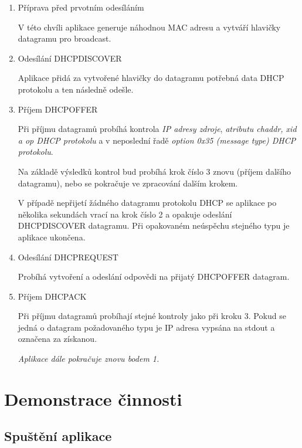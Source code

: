\documentclass[a4paper,11pt]{article}
\begin{document}
\begin{enumerate}
	\item Příprava před prvotním odesíláním
	
	V této chvíli aplikace generuje náhodnou MAC adresu a vytváří hlavičky datagramu pro broadcast.
	
	
	\item Odesílání \textsf{DHCPDISCOVER}
	
	Aplikace přidá za vytvořené hlavičky do datagramu potřebná data DHCP protokolu a ten následně odešle.
	
	
	\item Příjem \textsf{DHCPOFFER}
	
	Při příjmu datagramů probíhá kontrola \textit{IP adresy zdroje}, \textit{atributu \textsf{chaddr}, \textsf{xid} a \textsf{op} DHCP protokolu} a v neposlední řadě \textit{option \textsf{0x35 (message type)} DHCP protokolu}.
	
	Na základě výsledků kontrol bud probíhá krok číslo 3 znovu (příjem dalšího datagramu), nebo se pokračuje ve zpracování dalším krokem.
	
	V případě nepřijetí žádného datagramu protokolu DHCP se aplikace po několika sekundách vrací na krok číslo 2 a opakuje odeslání \textsf{DHCPDISCOVER} datagramu. Při opakovaném neúspěchu stejného typu je aplikace ukončena.
	
	
	\item Odesílání \textsf{DHCPREQUEST}
	
	Probíhá vytvoření a odeslání odpovědi na přijatý \textsf{DHCPOFFER} datagram.
	
	
	\item Příjem \textsf{DHCPACK}
	
	Při příjmu datagramů probíhají stejné kontroly jako při kroku 3. Pokud se jedná o datagram požadovaného typu je IP adresa vypsána na \textsf{stdout} a označena za získanou.
	
	\textit{Aplikace dále pokračuje znovu bodem 1.}
\end{enumerate}


\newpage
\section{Demonstrace činnosti} \label{demonstrace}

\subsection{Spuštění aplikace}
\end{document}
